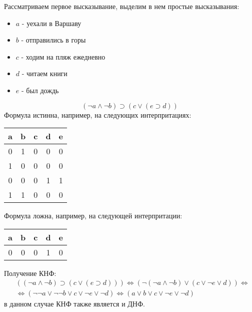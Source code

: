 \documentclass[a4paper,12pt]{article}
\begin{document}
\begin{Solution}
Рассматриваем первое высказывание, выделим в нем простые высказывания:
\begin{itemize}
\item $a$ - уехали в Варшаву

\item $b$ - отправились в горы

\item $c$ - ходим на пляж ежедневно

\item $d$ - читаем книги

\item $e$ - был дождь
\end{itemize}
\[
	\left(\neg a \wedge \neg b \right) \supset \left(c \vee \left(e \supset d\right)\right)
\]
Формула истинна, например, на следующих интерпритациях:

\begin{center}
\begin{tabular}[t]{|c|c|c|c|c|}
\hline
	a & b & c & d & e \\
\hline
	0 & 1 & 0 & 0 & 0 \\
\hline
	1 & 0 & 0 & 0 & 0 \\
\hline
	0 & 0 & 0 & 1 & 1 \\
\hline
	1 & 1 & 0 & 0 & 0 \\
\hline
\end{tabular}
\end{center}

Формула ложна, например, на следующей интерпритации:

\begin{center}
\begin{tabular}[t]{|c|c|c|c|c|}
\hline
	a & b & c & d & e \\
\hline
        0 & 0 & 0 & 1 & 0 \\
\hline
\end{tabular}
\end{center}


Получение КНФ:
\[
	\begin{split}
		& \left(\left(\neg a \wedge \neg b \right) \supset \left(c \vee \left(e \supset d\right)\right)\right) \Leftrightarrow \left(\neg \left(\neg a \wedge \neg b\right) \vee \left(c \vee \neg e \vee d\right)\right) \Leftrightarrow \\
		& \Leftrightarrow \left(\neg \neg a \vee \neg \neg b \vee c \vee \neg e \vee \neg d\right) \Leftrightarrow \left(a \vee b \vee c \vee \neg e \vee \neg d\right)
	\end{split}
\]
в данном случае КНФ также является и ДНФ.


\end{Solution}
\end{document}
